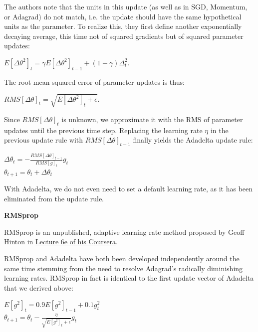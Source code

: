 \documentclass[4pt,journal,compsoc]{IEEEtran}
\begin{document}
\begin{flushleft}
    The authors note that the units in this update (as well as in SGD, Momentum, or Adagrad) do not match, i.e. the update should have the same hypothetical units as the parameter. To realize this, they first define another exponentially decaying average, this time not of squared gradients but of squared parameter updates: \newline
    
    $E[\Delta \theta ^ 2]_t = \gamma E[\Delta \theta ^ 2]_{t - 1} + (1 - \gamma) \Delta_t ^ 2$. \newline
    
    The root mean squared error of parameter updates is thus: \newline
    
    $RMS[\Delta \theta]_t = \sqrt{E[\Delta \theta ^ 2]_t + \epsilon}$. \newline
    
    Since $RMS[\Delta \theta]_t$ is unknown, we approximate it with the RMS of parameter updates until the previous time step. Replacing the learning rate $\eta$ in the previous update rule with $RMS[\Delta \theta]_{t - 1}$ finally yields the Adadelta update rule: \newline
    
    $\Delta \theta_t = - \frac{RMS[\Delta \theta]_{t-1}}{RMS[g]_t}g_t$ \\
    $\theta_{t+1} = \theta_t + \Delta \theta_t$ \newline
    
    With Adadelta, we do not even need to set a default learning rate, as it has been eliminated from the update rule. \newline \newline
    
    \textbf{\Large RMSprop} \newline

    RMSprop is an unpublished, adaptive learning rate method proposed by Geoff Hinton in \underline{Lecture 6e of his Coursera}. \newline
    
    RMSprop and Adadelta have both been developed independently around the same time stemming from the need to resolve Adagrad's radically diminishing learning rates. RMSprop in fact is identical to the first update vector of Adadelta that we derived above: \newline
    
    $E[g^2]_t = 0.9 E[g^2]_{t-1} + 0.1 g^2_t$\\
    $\theta_{t+1} = \theta_{t} - \frac{\eta}{\sqrt{E[g^2]_t + \epsilon}} g_{t}$ \newline
    

\end{flushleft}
\end{document}
